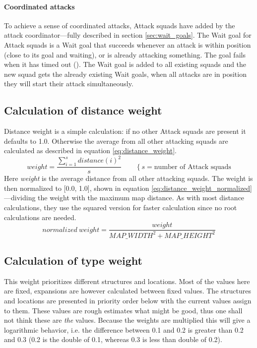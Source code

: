 \paragraph{Coordinated attacks}
To achieve a sense of coordinated attacks, Attack squads have  added by the
attack coordinator—fully described in section \ref{sec:wait_goals}. The Wait goal for Attack squads
is a Wait goal that succeeds whenever an attack is within position (close to its goal and waiting),
or is already attacking something. The goal fails when it has timed out
(\attackCoordinatorWaitGoalTimeout). The Wait goal is added to all existing squads and the new squad
gets the already existing Wait goals, when all attacks are in position they will start their attack
simultaneously.

\subsection{Calculation of distance weight}
Distance weight is a simple calculation: if no other Attack squads are present it defaults to 1.0.
Otherwise the average from all other attacking squads are calculated as described in equation
\ref{eq:distance_weight}.
\begin{equation}
\label{eq:distance_weight}
weight = \frac{\sum_{i=1}^{s}{distance(i)^2}}{s} \qquad \left\{s = \text{number of Attack squads}\right.
\end{equation}
Here \emph{weight} is the average distance from all other attacking squads. The weight is then
normalized to [0.0, 1.0], shown in equation \ref{eq:distance_weight_normalized}—dividing the weight
with the maximum map distance. As with most distance calculations, they use the squared version for
faster calculation since no root calculations are needed.
\begin{equation}
\label{eq:distance_weight_normalized}
normalized\ weight = \frac{weight}{MAP\_WIDTH^2 + MAP\_HEIGHT^2}
\end{equation}


\subsection{Calculation of type weight}
This weight prioritizes different structures and locations. Most of the values here are fixed,
expansions are however calculated between fixed values. The structures and locations are presented in
priority order below with the current values assign to them. These values are rough estimates what
might be good, thus one shall not think these are \emph{the} values. Because the weights are
multiplied this will give a logarithmic behavior, i.e. the difference between 0.1 and 0.2 is greater
than 0.2 and 0.3 (0.2 is the double of 0.1, whereas 0.3 is less than double of 0.2).

